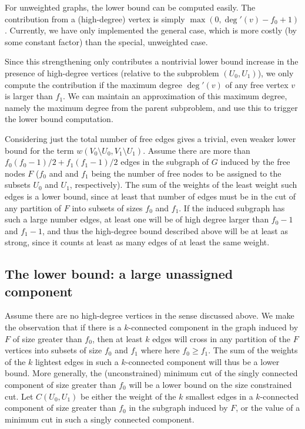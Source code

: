 \documentclass[a4paper,11pt]{article}
\begin{document}
For unweighted graphs, the lower bound can be computed easily. The
contribution from a (high-degree) vertex is simply
$\max(0,\deg'(v)-f_0+1)$. Currently, we have only implemented the
general case, which is more costly (by some constant factor) than the
special, unweighted case.

Since this strengthening only contributes a nontrivial lower bound
increase in the presence of high-degree vertices (relative to the
subproblem $(U_0,U_1)$), we only compute the contribution if the
maximum degree $\deg'(v)$ of any free vertex $v$ is larger than
$f_1$. We can maintain an approximation of this maximum degree, namely
the maximum degree from the parent subproblem, and use this to trigger
the lower bound computation.

Considering just the total number of free edges gives a trivial, even
weaker lower bound for the term $w(V_0\setminus U_0,V_1\setminus
U_1)$. Assume there are more than $f_0(f_0-1)/2+f_1(f_1-1)/2$ edges in
the subgraph of $G$ induced by the free nodes $F$ ($f_0$ and and $f_1$
being the number of free nodes to be assigned to the subsets $U_0$ and
$U_1$, respectively). The sum of the weights of the least weight such
edges is a lower bound, since at least that number of edges must be in
the cut of any partition of $F$ into subsets of sizes $f_0$ and
$f_1$. If the induced subgraph has such a large number edges, at least
one will be of high degree larger than $f_0-1$ and $f_1-1$, and thus the
high-degree bound described above will be at least as strong, since it
counts at least as many edges of at least the same weight.

\subsection{The lower bound: a large unassigned component}
\label{sec:largecomponent}

Assume there are no high-degree vertices in the sense discussed
above. We make the observation that if there is a $k$-connected
component in the graph induced by $F$ of size greater than $f_0$, then
at least $k$ edges will cross in any partition of the $F$ vertices
into subsets of size $f_0$ and $f_1$ where here $f_0\geq f_1$. The sum
of the weights of the $k$ lightest edges in such a $k$-connected
component will thus be a lower bound. More generally, the
(unconstrained) minimum cut of the singly connected component of size
greater than $f_0$ will be a lower bound on the size constrained
cut. Let $C(U_0,U_1)$ be either the weight of the $k$ smallest edges
in a $k$-connected component of size greater than $f_0$ in the
subgraph induced by $F$, or the value of a minimum cut in such a
singly connected component.
\end{document}
